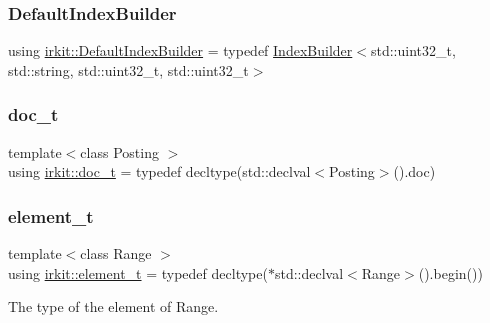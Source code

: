 \mbox{\label{namespaceirkit_aefd5a5c2f1136e9c2224a4b4d659d4a9}} 
\subsubsection{\texorpdfstring{Default\+Index\+Builder}{DefaultIndexBuilder}}
{\footnotesize\ttfamily using \hyperlink{namespaceirkit_aefd5a5c2f1136e9c2224a4b4d659d4a9}{irkit\+::\+Default\+Index\+Builder} = typedef \hyperlink{classirkit_1_1IndexBuilder}{Index\+Builder}$<$std\+::uint32\+\_\+t, std\+::string, std\+::uint32\+\_\+t, std\+::uint32\+\_\+t$>$}

\mbox{\label{namespaceirkit_a595d83053e112c98ab2a1b65e5dd74be}} 
\subsubsection{\texorpdfstring{doc\+\_\+t}{doc\_t}}
{\footnotesize\ttfamily template$<$class Posting $>$ \\
using \hyperlink{namespaceirkit_a595d83053e112c98ab2a1b65e5dd74be}{irkit\+::doc\+\_\+t} = typedef decltype(std\+::declval$<$Posting$>$().doc)}

\mbox{\label{namespaceirkit_a40deb8b0d47ecaada4b47270b97d5469}} 
\subsubsection{\texorpdfstring{element\+\_\+t}{element\_t}}
{\footnotesize\ttfamily template$<$class Range $>$ \\
using \hyperlink{namespaceirkit_a40deb8b0d47ecaada4b47270b97d5469}{irkit\+::element\+\_\+t} = typedef decltype($\ast$std\+::declval$<$Range$>$().begin())}



The type of the element of Range. 

\mbox{\label{namespaceirkit_af390a50be8f636e7239c650e5043c56f}} 

